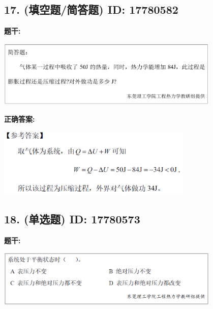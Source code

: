 \documentclass[12pt]{article}
\begin{document}
\vspace{0.5em}\hrulefill\vspace{1em}

\subsection*{17. (填空题/简答题) \small ID: 17780582}

\textbf{题干:}


\begin{center}\includegraphics[width=0.8\textwidth, height=0.25\textheight, keepaspectratio]{question_17_17780582/title_img_1.png}\end{center}

\textbf{正确答案:}

\begin{center}\includegraphics[width=0.7\textwidth, height=0.2\textheight, keepaspectratio]{question_17_17780582/correct_answer_1_img_1.png}\end{center}

\vspace{0.5em}\hrulefill\vspace{1em}

\subsection*{18. (单选题) \small ID: 17780573}

\textbf{题干:}


\begin{center}\includegraphics[width=0.8\textwidth, height=0.25\textheight, keepaspectratio]{question_18_17780573/title_img_1.png}\end{center}
\end{document}
